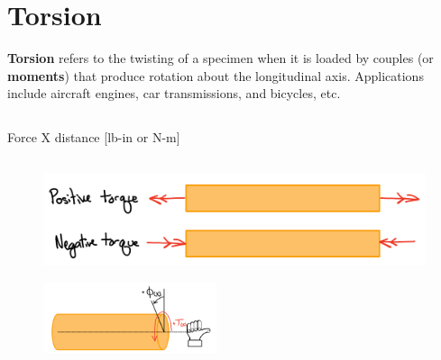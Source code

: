 \section{Torsion}

\textbf{Torsion} refers to the twisting of a specimen when it is loaded by couples (or \textbf{moments}) that produce rotation about the longitudinal axis. Applications include aircraft engines, car transmissions, and bicycles, etc.

\subsection{}

Force X distance [lb-in or N-m]

\subsection{}

\begin{figure}[!h]
\centering
\includegraphics[angle=0, width=5in]{Torsion-Figures/Convention.png}
\vspace{-2mm}
\caption{\small {}}
\vspace{-3mm}
\label{Fig:TorsionConvention}
\end{figure}


\begin{figure}[!h]
\centering
\includegraphics[angle=0, width=2in]{Torsion-Figures/RightHandRule.png}
\vspace{-2mm}
\caption{\small {}}
\vspace{-3mm}
\label{Fig:RHR}
\end{figure}


